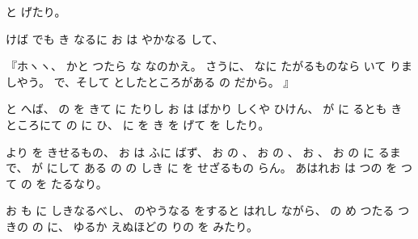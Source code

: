 と
げたり。

けば
でも
き
なるに
お
は
やかなる
して、

『ホヽヽ、
かと
つたら
な
なのかえ。
さうに、
なに
たがるものなら
いて
りましやう。
で、そして
としたところがある
の
だから。
』

と
へば、
の
を
きて
に
たりし
お
は
ばかり
しくや
ひけん、
が
に
るとも
きところにて
の
に
ひ、
に
を
き
を
げて
を
したり。

より
を
きせるもの、
お
は
ふに
ばず、
お
の
、
お
の
、
お
、
お
の
に
るまで、
が
にして
ある
の
の
しき
に
を
せざるもの
らん。
あはれお
は
つの
を
つて
の
を
たるなり。

お
も
に
しきなるべし、
のやうなる
をすると
はれし
ながら、
の
め
つたる
つきの
の
に、
ゆるか
えぬほどの
りの
を
みたり。

